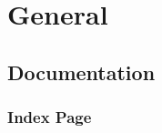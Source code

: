 \newcommand{\DocMainTitle}{Documenter LaTeX}
\newcommand{\DocVersion}{}
\newcommand{\DocAuthors}{}
\newcommand{\JuliaVersion}{1.9.0}




\part{General}


\chapter{Documentation}



\label{15370268649601208206}{}


\section{Index Page}



\label{717217368905959711}{}

